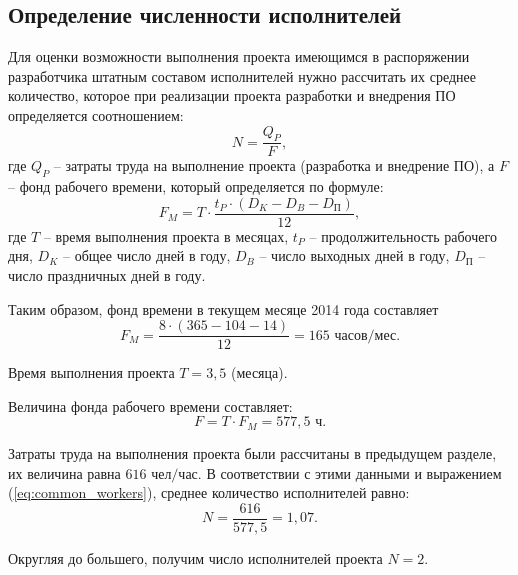 \subsection{Определение численности исполнителей} \label{workers}

Для оценки возможности выполнения проекта имеющимся в распоряжении разработчика штатным составом исполнителей нужно рассчитать их среднее количество, которое при реализации проекта разработки и внедрения ПО определяется соотношением:
\begin{equation}
  \label{eq:common_workers}
N = \frac {Q_P} {F},
\end{equation}
где $Q_P$ -- затраты труда на выполнение проекта (разработка и внедрение ПО), а $F$ -- фонд рабочего времени, который определяется по формуле:
\begin{equation}
  \label{eq:time_fund_month_common}
F_M = T \cdot \frac {t_P \cdot (D_K - D_B - D_\textrm{П})} {12},
\end{equation}
где $T$ -- время выполнения проекта в месяцах, $t_P$ -- продолжительность рабочего дня, $D_K$ -- общее число дней в году, $D_B$ -- число выходных дней в году, $D_\textrm{П}$ -- число праздничных дней в году.

\vspace{\baselineskip}
Таким образом, фонд времени в текущем месяце 2014 года составляет
\begin{equation}
  \label{eq:time_fund_month}
F_M = \frac {8 \cdot (365 - 104 - 14)} {12} = 165 \textrm{ часов/мес}.
\end{equation}

Время выполнения проекта $T = 3,5$ (месяца).

\vspace{\baselineskip}
Величина фонда рабочего времени составляет:
\begin{equation}
  \label{eq:time_fund}
F = T \cdot F_M = 577,5 \textrm{ ч}.
\end{equation}

Затраты труда на выполнения проекта были рассчитаны в предыдущем разделе, их величина равна $616 \textrm{ чел/час}$. В соответствии с этими данными и выражением (\ref{eq:common_workers}), среднее количество исполнителей равно:
\begin{equation}
  \label{eq:workers_avg}
N = \frac {616} {577,5} = 1,07.
\end{equation}

Округляя до большего, получим число исполнителей проекта $N = 2$. 